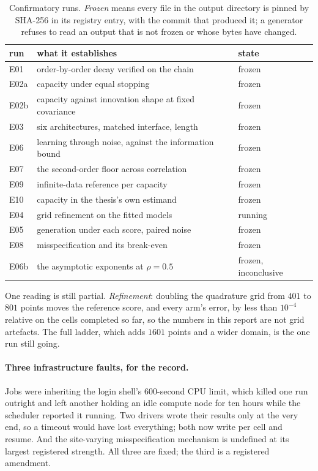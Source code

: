 \documentclass[11pt,a4paper]{article}
\begin{document}
\begin{table}[htbp]
\centering
\small
\caption{Confirmatory runs. \emph{Frozen} means every file in the output directory is pinned by
SHA-256 in its registry entry, with the commit that produced it; a generator refuses to read an
output that is not frozen or whose bytes have changed.}
\label{tab:status}
\begin{tabular}{l l l}
\toprule
run & what it establishes & state \\
\midrule
E01  & order-by-order decay verified on the chain              & frozen \\
E02a & capacity under equal stopping                            & frozen \\
E02b & capacity against innovation shape at fixed covariance    & frozen \\
E03  & six architectures, matched interface, length             & frozen \\
E06  & learning through noise, against the information bound    & frozen \\
E07  & the second-order floor across correlation                & frozen \\
E09  & infinite-data reference per capacity                     & frozen \\
\midrule
E10  & capacity in the thesis's own estimand                    & frozen \\
E04  & grid refinement on the fitted models                     & running \\
E05  & generation under each score, paired noise                & frozen \\
E08  & misspecification and its break-even                      & frozen \\
E06b & the asymptotic exponents at $\rho=0.5$                   & frozen, inconclusive \\
\bottomrule
\end{tabular}
\end{table}

One reading is still partial. \emph{Refinement}: doubling the quadrature grid from $401$ to $801$
points moves the reference score, and every arm's error, by less than $10^{-4}$ relative on the
cells completed so far, so the numbers in this report are not grid artefacts. The full ladder, which
adds $1601$ points and a wider domain, is the one run still going.

\paragraph{Three infrastructure faults, for the record.}
Jobs were inheriting the login shell's $600$-second CPU limit, which killed one run outright and
left another holding an idle compute node for ten hours while the scheduler reported it running.
Two drivers wrote their results only at the very end, so a timeout would have lost everything; both
now write per cell and resume. And the site-varying misspecification mechanism is undefined at its
largest registered strength. All three are fixed; the third is a registered amendment.
\end{document}
